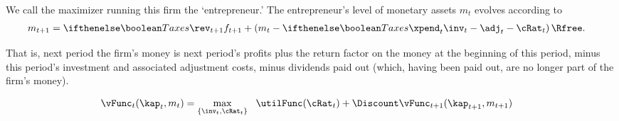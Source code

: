 We call the maximizer running this firm the `entrepreneur.'  The entrepreneur's level of monetary assets $m_{t}$ evolves according to
\begin{equation}\begin{gathered}\begin{aligned}
  m_{t+1} & =  \ifTax{\rev_{t+1}}{f_{t+1}}+\left(m_{t}-\ifTax{\xpend_{t}}{\inv_{t}-\adj_{t}}-\cRat_{t}\right)\Rfree.
\end{aligned}\end{gathered}\end{equation}

That is, next period the firm's money is next period's profits plus the
return factor on the money at the beginning of this period, minus
this period's investment and associated adjustment costs, minus dividends paid out
(which, having been paid out, are no longer part of the firm's money).


\begin{equation}\begin{gathered}\begin{aligned}
  \vFunc_{t}(\kap_{t},m_{t}) & =  \max_{\{\inv_{t},\cRat_{t}\}}~~\utilFunc(\cRat_{t}) +\Discount \vFunc_{t+1}(\kap_{t+1},m_{t+1})\nonumber
\end{aligned}\end{gathered}\end{equation}


